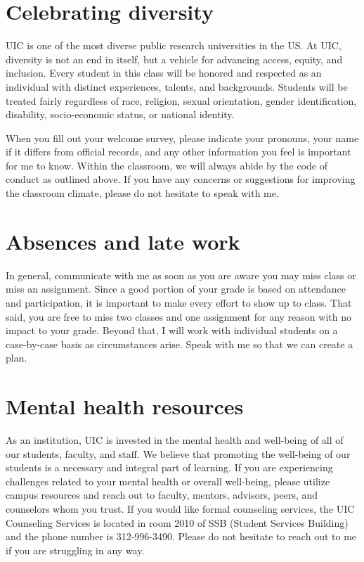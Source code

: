 \documentclass[
]{report}
\begin{document}
\hypertarget{celebrating-diversity}{%
\section*{Celebrating diversity}\label{celebrating-diversity}}

UIC is one of the most diverse public research universities in the US. At UIC, diversity is not an end in itself, but a vehicle for advancing access, equity, and inclusion. Every student in this class will be honored and respected as an individual with distinct experiences, talents, and backgrounds. Students will be treated fairly regardless of race, religion, sexual orientation, gender identification, disability, socio-economic status, or national identity.

When you fill out your welcome survey, please indicate your pronouns, your name if it differs from official records, and any other information you feel is important for me to know. Within the classroom, we will always abide by the code of conduct as outlined above. If you have any concerns or suggestions for improving the classroom climate, please do not hesitate to speak with me.

\hypertarget{absences-and-late-work}{%
\section*{Absences and late work}\label{absences-and-late-work}}

In general, communicate with me as soon as you are aware you may miss class or miss an assignment. Since a good portion of your grade is based on attendance and participation, it is important to make every effort to show up to class. That said, you are free to miss two classes and one assignment for any reason with no impact to your grade. Beyond that, I will work with individual students on a case-by-case basis as circumstances arise. Speak with me so that we can create a plan.

\hypertarget{mental-health-resources}{%
\section*{Mental health resources}\label{mental-health-resources}}

As an institution, UIC is invested in the mental health and well-being of all of our students, faculty, and staff. We believe that promoting the well-being of our students is a necessary and integral part of learning. If you are experiencing challenges related to your mental health or overall well-being, please utilize campus resources and reach out to faculty, mentors, advisors, peers, and counselors whom you trust. If you would like formal counseling services, the UIC Counseling Services is located in room 2010 of SSB (Student Services Building) and the phone number is 312-996-3490. Please do not hesitate to reach out to me if you are struggling in any way.
\end{document}
